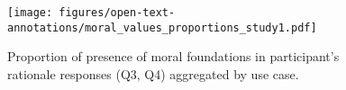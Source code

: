 \begin{figure}[!hptb]
    \centering
    \texttt{[image: figures/open-text-annotations/moral\_values\_proportions\_study1.pdf]}
    \caption{Proportion of presence of moral foundations in participant's rationale responses (Q3, Q4) aggregated by use case.}
    \label{fig:moral_values_proportions}
\end{figure}